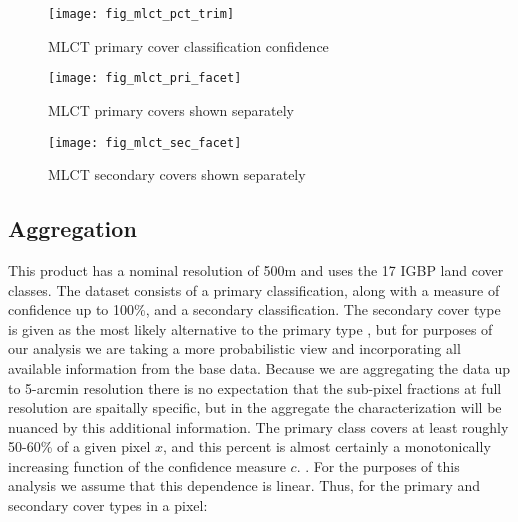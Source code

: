 \begin{figure} 
\begin{center}
  

\texttt{[image: fig\_mlct\_pct\_trim]}
\end{center} 
\caption{MLCT primary cover classification confidence} 
\label{fig:mlct_pct} 
\end{figure} 



\begin{figure} 
\begin{center}
  

\texttt{[image: fig\_mlct\_pri\_facet]}
\end{center} 
\caption{MLCT primary covers shown separately} 
\label{fig:mlct_pri_reclass} 
\end{figure} 


\begin{figure} 
\begin{center}
  

\texttt{[image: fig\_mlct\_sec\_facet]}
\end{center} 
\caption{MLCT secondary covers shown separately} 
\label{fig:mlct_pri_reclass} 
\end{figure} 


\subsection{Aggregation}
\label{sec:mlct-aggr}

This product has a nominal resolution of 500m and uses the 17 IGBP
land cover classes. The dataset consists of a primary classification,
along with a measure of confidence up to 100\%, and a secondary
classification.  The secondary cover type is given as the most likely
alternative to the primary type \citep{Friedl2010}, but for purposes
of our analysis we are taking a more probabilistic view and
incorporating all available information from the base data.  Because
we are aggregating the data up to 5-arcmin resolution there is no
expectation that the sub-pixel fractions at full resolution are
spaitally specific, but in the aggregate the characterization will be
nuanced by this additional information.  The primary class covers at
least roughly 50-60\% of a given pixel $x$, and this percent is almost
certainly a monotonically increasing function of the confidence
measure $c$.  .  For the purposes of this
analysis we assume that this dependence is linear. Thus, for the
primary and secondary cover types in a pixel:

